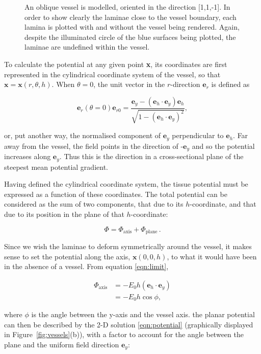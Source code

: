 \begin{figure}[htbp]
    \caption{An oblique vessel is modelled, oriented in the direction [1,1,-1]. In order to show clearly the laminae close to the vessel boundary, each lamina is plotted with and without the vessel being rendered. Again, despite the illuminated circle of the blue surfaces being plotted, the laminae are undefined within the vessel.}
    \label{fig:oblique}
  \end{figure}
  
  To calculate the potential at any given point \textbf{x}, its coordinates are first represented in the cylindrical coordinate system of the vessel, so that $\mathbf{x} = \mathbf{x}(r,\theta,h)$. When $\theta = 0$, the unit vector in the $r$-direction $\mathbf{e}_r$ is defined as
  
  \begin{equation}
    \mathbf{e}_r(\theta = 0) \mathbf{e}_{r0} = \frac{\mathbf{e}_y - (\mathbf{e}_h \cdot \mathbf{e}_y) \mathbf{e}_h}{\sqrt{1 - \left(\mathbf{e}_h \cdot \mathbf{e}_y\right)^2}},
  \end{equation}
  
  or, put another way, the normalised component of $\mathbf{e}_y$ perpendicular to $\mathbf{e}_h$. Far away from the vessel, the field points in the direction of -$\mathbf{e}_y$ and so the potential increases along $\mathbf{e}_y$. Thus this is the direction in a cross-sectional plane of the steepest mean potential gradient.
  
  Having defined the cylindrical coordinate system, the tissue potential must be expressed as a function of these coordinates. The total potential can be considered as the sum of two components, that due to its $h$-coordinate, and that due to its position in the plane of that $h$-coordinate:
  
  \begin{equation}
    \Phi = \Phi_{\text{axis}} + \Phi_{\text{plane}}\,.
  \end{equation}
  
  Since we wish the laminae to deform symmetrically around the vessel, it makes sense to set the potential along the axis, $\mathbf{x}(0,0,h)$, to what it would have been in the absence of a vessel. From equation \ref{eqn:limit},
  
  \begin{align}
    \Phi_{\text{axis}} & = -E_0h(\mathbf{e}_h \cdot \mathbf{e}_y) \\
    & = -E_0h\cos\phi,
  \end{align}
  
  where $\phi$ is the angle between the y-axis and the vessel axis. the planar potential can then be described by the 2-D solution \ref{eqn:potential} (graphically displayed in Figure~\ref{fig:vessels}(b)), with a factor to account for the angle between the plane and the uniform field direction $\mathbf{e}_y$:
  
